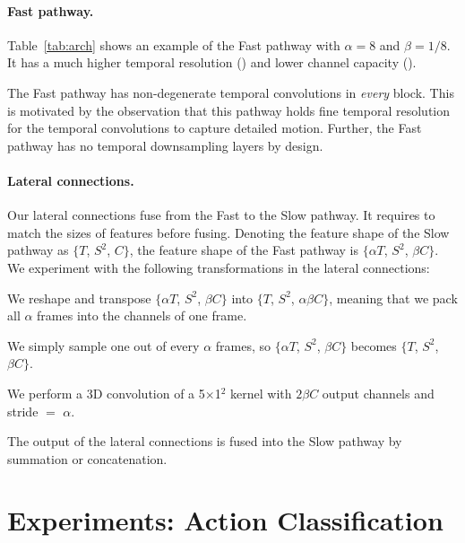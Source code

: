 \documentclass[10pt,twocolumn,letterpaper]{article}
\def\x{$\times$}
\renewcommand{\omega}{\alpha}
\renewcommand{\phi}{\beta}
\begin{document}
	\paragraph{Fast pathway.}
	Table~\ref{tab:arch} shows an example of the Fast pathway with $\omega=8$ and $\phi=1/8$. It has a much higher temporal resolution () and lower channel capacity ().
	
	The Fast pathway has non-degenerate temporal convolutions in \emph{every} block. This is motivated by the observation that this pathway holds fine temporal resolution for the temporal convolutions to capture detailed motion. Further, the Fast pathway has no temporal downsampling layers by design.
	
	\paragraph{Lateral connections.} Our lateral connections fuse from the Fast to the Slow pathway.
	It requires to match the sizes of features before fusing.
	Denoting the feature shape of the Slow pathway as $\{$$T$, $S^2$, $C$$\}$, the feature shape of the Fast pathway is $\{$$\omega T$, $S^2$, $\phi C$$\}$.
	We experiment with the following transformations in the lateral connections:
	
	\vspace{.5em}
	 We reshape and transpose $\{$$\omega T$, $S^2$, $\phi C$$\}$ into $\{$$T$, $S^2$, $\omega\phi C$$\}$, meaning that we pack all $\omega$ frames into the channels of one frame.
	
	\vspace{.5em}
	 We simply sample one out of every $\omega$ frames, so $\{$$\omega T$, $S^2$, $\phi C$$\}$ becomes $\{$$T$, $S^2$, $\phi C$$\}$.
	
	\vspace{.5em}
	 We perform a 3D convolution of a 5\x1$^\text{2}$ kernel with $2\phi C$ output channels and stride $=$ $\omega$.
	
	\vspace{.5em}
	\noindent
	The output of the lateral connections is fused into the Slow pathway by summation or concatenation.
	
	\section{Experiments: Action Classification} \label{sec:kinetics}
	
\end{document}
